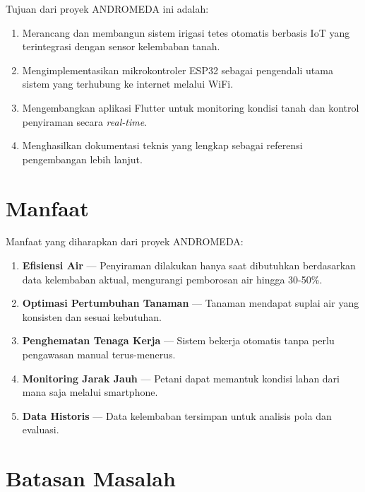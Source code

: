 \documentclass[12pt,a4paper,oneside]{report}
\begin{document}
Tujuan dari proyek ANDROMEDA ini adalah:
\begin{enumerate}
    \item Merancang dan membangun sistem irigasi tetes otomatis berbasis IoT yang terintegrasi dengan sensor kelembaban tanah.
    \item Mengimplementasikan mikrokontroler ESP32 sebagai pengendali utama sistem yang terhubung ke internet melalui WiFi.
    \item Mengembangkan aplikasi Flutter untuk monitoring kondisi tanah dan kontrol penyiraman secara \textit{real-time}.
    \item Menghasilkan dokumentasi teknis yang lengkap sebagai referensi pengembangan lebih lanjut.
\end{enumerate}

\section{Manfaat}

Manfaat yang diharapkan dari proyek ANDROMEDA:
\begin{enumerate}
    \item \textbf{Efisiensi Air} — Penyiraman dilakukan hanya saat dibutuhkan berdasarkan data kelembaban aktual, mengurangi pemborosan air hingga 30-50\%.
    \item \textbf{Optimasi Pertumbuhan Tanaman} — Tanaman mendapat suplai air yang konsisten dan sesuai kebutuhan.
    \item \textbf{Penghematan Tenaga Kerja} — Sistem bekerja otomatis tanpa perlu pengawasan manual terus-menerus.
    \item \textbf{Monitoring Jarak Jauh} — Petani dapat memantuk kondisi lahan dari mana saja melalui smartphone.
    \item \textbf{Data Historis} — Data kelembaban tersimpan untuk analisis pola dan evaluasi.
\end{enumerate}

\section{Batasan Masalah}
\end{document}
